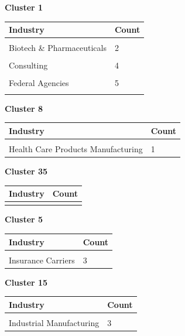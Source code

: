 \documentclass[
]{article}
\begin{document}
\textbf{Cluster 1}

\begin{tabular}{ll}
\toprule
Industry & Count\\
\midrule
\cellcolor{gray!10}{Aerospace \& Defense} & \cellcolor{gray!10}{2}\\
Biotech \& Pharmaceuticals & 2\\
\cellcolor{gray!10}{Computer Hardware \& Software} & \cellcolor{gray!10}{2}\\
Consulting & 4\\
\cellcolor{gray!10}{Enterprise Software \& Network Solutions} & \cellcolor{gray!10}{7}\\
\addlinespace
Federal Agencies & 5\\
\cellcolor{gray!10}{IT Services} & \cellcolor{gray!10}{12}\\
\bottomrule
\end{tabular}

\textbf{Cluster 8}

\begin{tabular}{ll}
\toprule
Industry & Count\\
\midrule
\cellcolor{gray!10}{Biotech \& Pharmaceuticals} & \cellcolor{gray!10}{14}\\
Health Care Products Manufacturing & 1\\
\bottomrule
\end{tabular}

\textbf{Cluster 35}

\begin{tabular}{ll}
\toprule
Industry & Count\\
\midrule
\cellcolor{gray!10}{Insurance Carriers} & \cellcolor{gray!10}{10}\\
\bottomrule
\end{tabular}

\textbf{Cluster 5}

\begin{tabular}{ll}
\toprule
Industry & Count\\
\midrule
\cellcolor{gray!10}{Health Care Services \& Hospitals} & \cellcolor{gray!10}{1}\\
Insurance Carriers & 3\\
\bottomrule
\end{tabular}

\textbf{Cluster 15}

\begin{tabular}{ll}
\toprule
Industry & Count\\
\midrule
\cellcolor{gray!10}{Enterprise Software \& Network Solutions} & \cellcolor{gray!10}{2}\\
Industrial Manufacturing & 3\\
\bottomrule
\end{tabular}
\end{document}
